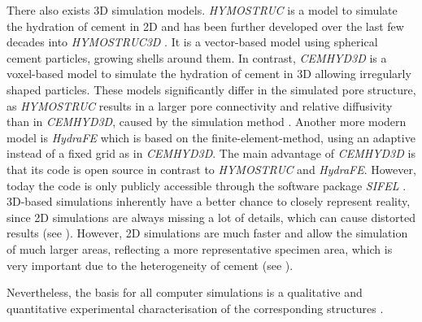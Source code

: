 There also exists 3D simulation models.
\textit{HYMOSTRUC} \cite{vanbreugel.1995} is a model to simulate the hydration of cement in 2D and has been further developed over the last few decades into \textit{HYMOSTRUC3D} \cite{ye.2007, liu.2014, gao.2014, qian.2017, gao.2019}.
It is a vector-based model using spherical cement particles, growing shells around them.
In contrast, \textit{CEMHYD3D} \cite{bentz.2005} is a voxel-based model to simulate the hydration of cement in 3D allowing irregularly shaped particles.
These models significantly differ in the simulated pore structure, as \textit{HYMOSTRUC} results in a larger pore connectivity and relative diffusivity than in \textit{CEMHYD3D}, caused by the simulation method \cite{gao.2013}.
Another more modern model is \textit{HydraFE} \cite{nothnagel.2007} which is based on the finite-element-method, using an adaptive instead of a fixed grid as in \textit{CEMHYD3D}.
The main advantage of \textit{CEMHYD3D} is that its code is open source \cite{bentz.2005,gao.2013} in contrast to \textit{HYMOSTRUC} and \textit{HydraFE}.
However, today the code is only publicly accessible through the software package \textit{SIFEL} \cite{kruis.2001, smilauer.2009}.
3D-based simulations inherently have a better chance to closely represent reality, since 2D simulations are always missing a lot of details, which can cause distorted results (see ).
However, 2D simulations are much faster and allow the simulation of much larger areas, reflecting a more representative specimen area, which is very important due to the heterogeneity of cement (see ).

Nevertheless, the basis for all computer simulations is a qualitative and quantitative experimental characterisation of the corresponding structures \cite{nguyen-tuan.2019, gobel.2018a}.




